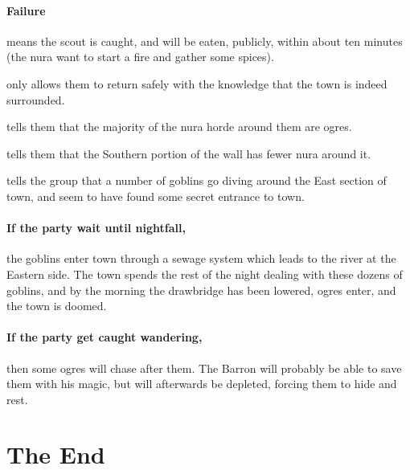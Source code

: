 \begin{multicols}{2}
		\paragraph{Failure}
		means the scout is caught, and will be eaten, publicly, within about ten minutes (the nura want to start a fire and gather some spices).

\setcounter{list}{-1}
\begin{list}{\addtocounter{list}{1}\textbf{Margin }:}{\raggedleft}

	\item{only allows them to return safely with the knowledge that the town is indeed surrounded.}
	\item{tells them that the majority of the nura horde around them are ogres.}
	\item{tells them that the Southern portion of the wall has fewer nura around it.}
	\item{tells the group that a number of goblins go diving around the East section of town, and seem to have found some secret entrance to town.}
\end{list}

\paragraph{If the party wait until nightfall,}
the goblins enter town through a sewage system which leads to the river at the Eastern side.
The town spends the rest of the night dealing with these dozens of goblins, and by the morning the drawbridge has been lowered, ogres enter, and the town is doomed.

\paragraph{If the party get caught wandering,}
then some ogres will chase after them.
The Barron will probably be able to save them with his magic, but will afterwards be depleted, forcing them to hide and rest.

\ogre

\end{multicols}

\section{The End}

